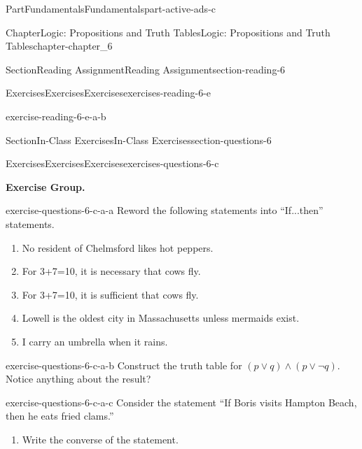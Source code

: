 \documentclass[oneside,10pt,]{book}
\numberwithin{equation}{section}
\begin{document}
\begin{partptx}{Part}{Fundamentals}{}{Fundamentals}{}{}{part-active-ads-c}
\begin{chapterptx}{Chapter}{Logic: Propositions and Truth Tables}{}{Logic: Propositions and Truth Tables}{}{}{chapter-chapter_6}
\begin{sectionptx}{Section}{Reading Assignment}{}{Reading Assignment}{}{}{section-reading-6}
\begin{exercises-subsection-numberless}{Exercises}{Exercises}{}{Exercises}{}{}{exercises-reading-6-e}
\begin{exercisegroup}
\begin{divisionexerciseeg}{2}{}{}{exercise-reading-6-e-a-b}
\begin{multicols}{2}
\end{multicols}
%
\end{divisionexerciseeg}%
\end{exercisegroup}
\par\medskip\noindent
\end{exercises-subsection-numberless}
\end{sectionptx}
%
%
\typeout{************************************************}
\typeout{************************************************}
%
\begin{sectionptx}{Section}{In-Class Exercises}{}{In-Class Exercises}{}{}{section-questions-6}
%
%
%
\typeout{************************************************}
\typeout{************************************************}
%
\begin{exercises-subsection-numberless}{Exercises}{Exercises}{}{Exercises}{}{}{exercises-questions-6-c}
\par\medskip\noindent%
\textbf{Exercise Group.}\space\space%
\begin{exercisegroup}
\begin{divisionexerciseeg}{1}{}{}{exercise-questions-6-c-a-a}%
Reword the following statements into ``If...then'' statements.%
\begin{enumerate}[label=(\alph*)]
\item{}No resident of Chelmsford likes hot peppers.%
\item{}For 3+7=10, it is necessary that cows fly.%
\item{}For 3+7=10, it is sufficient that cows fly.%
\item{}Lowell is the oldest city in Massachusetts unless mermaids exist.%
\item{}I carry an umbrella when it rains.%
\end{enumerate}
%
\end{divisionexerciseeg}%
\begin{divisionexerciseeg}{2}{}{}{exercise-questions-6-c-a-b}%
Construct the truth table for \((p \lor q) \land (p\lor \neg q)\).   Notice anything about the result?%
\end{divisionexerciseeg}%
\begin{divisionexerciseeg}{3}{}{}{exercise-questions-6-c-a-c}%
Consider the statement “If Boris visits Hampton Beach, then he eats fried clams.”%
\begin{enumerate}[label=(\alph*)]
\item{}Write the converse of the statement.%

\end{enumerate}
\end{divisionexerciseeg}
\end{exercisegroup}
\end{exercises-subsection-numberless}
\end{sectionptx}
\end{chapterptx}
\end{partptx}
\end{document}
